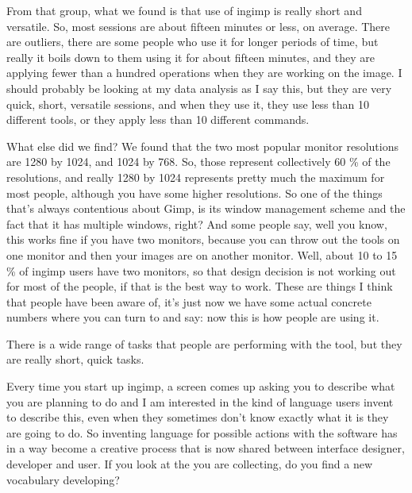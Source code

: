 {From that group, what we found is that use of ingimp is really short and
versatile. So, most sessions are about fifteen minutes or less, on
average. There are outliers, there are some people who use it for
longer periods of time, but really it boils down to them using it for
about fifteen minutes, and they are applying fewer than a hundred
operations when they are working on the image. I should probably be
looking at my data analysis as I say this, but they are very quick,
short, versatile sessions, and when they use it, they use less than 10
different tools, or they apply less than 10 different commands.\par

What else did we find? We found that the two most popular monitor
resolutions are 1280 by 1024, and 1024 by 768. So, those represent
collectively 60 \% of the resolutions, and really 1280 by 1024
represents pretty much the maximum for most people, although you have
some higher resolutions. So one of the things that's always contentious
about Gimp, is its window management scheme and the fact that it has
multiple windows, right? And some people say, well you know, this works
fine if you have two monitors, because you can throw out the tools on
one monitor and then your images are on another monitor. Well, about 10
to 15 \% of ingimp users have two monitors, so that design decision is
not working out for most of the people, if that is the best way to
work. These are things I think that people have been aware of, it's
just now we have some actual concrete numbers where you can turn to and
say: now this is how people are using it.\par 

There is a wide range of tasks that people are performing with the tool,
but they are really short, quick tasks.\par

 Every time you start up ingimp, a screen comes up asking you to
describe what you are planning to do and I am interested in the kind of
language users invent to describe this, even when they sometimes don't
know exactly what it is they are going to do. So inventing language for
possible actions with the software has in a way become a creative
process that is now shared between interface designer, developer and
user. If you look at the  you are collecting, do you find a new vocabulary
developing?\par

}
